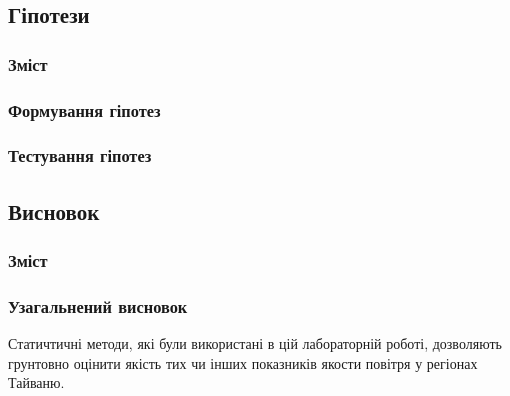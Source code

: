 \documentclass{beamer}
\begin{document}
  

\begin{frame}
  \section{Гіпотези}

  \frametitle{Зміст}
  \tableofcontents[currentsection]
\end{frame}

\begin{frame}
  \frametitle{Формування гіпотез}

  
\end{frame}

\begin{frame}
  \frametitle{Тестування гіпотез}

  
\end{frame}


\begin{frame}
  \section{Висновок}

  \frametitle{Зміст}
  \tableofcontents[currentsection]
\end{frame}

\begin{frame}
  \frametitle{Узагальнений висновок}
  Статичтичні методи, які були використані в цій лабораторній роботі, 
  дозволяють грунтовно оцінити якість тих чи інших показників якости повітря у регіонах Тайваню.
  
\end{frame}
\end{document}
